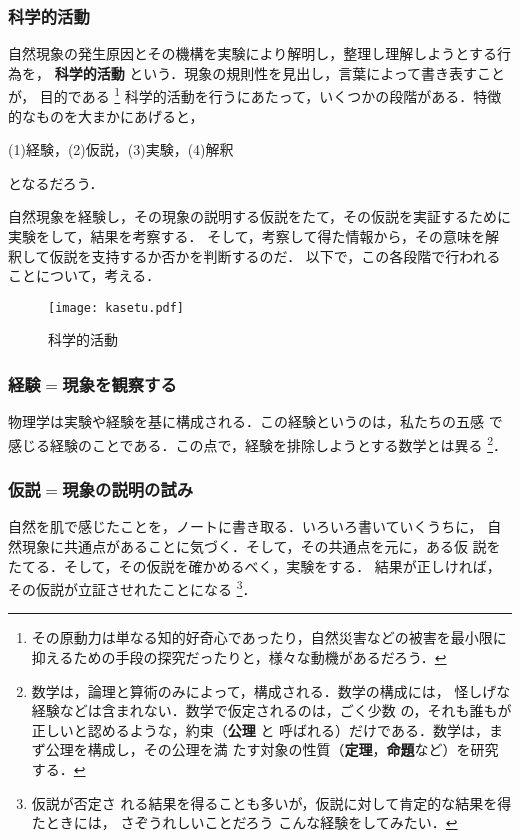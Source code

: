         \subsubsection{科学的活動}
            自然現象の発生原因とその機構を実験により解明し，整理し理解しようとする行為を，
            \textbf{科学的活動} という．現象の規則性を見出し，言葉によって書き表すことが，
            目的である
                \footnote{
                    その原動力は単なる知的好奇心であったり，自然災害などの被害を最小限に
                    抑えるための手段の探究だったりと，様々な動機があるだろう．
                }
            科学的活動を行うにあたって，いくつかの段階がある．特徴的なものを大まかにあげると，
            \begin{center}
                (1)経験，(2)仮説，(3)実験，(4)解釈
            \end{center}
            となるだろう．

            自然現象を経験し，その現象の説明する仮説をたて，その仮説を実証するために実験をして，結果を考察する．
            そして，考察して得た情報から，その意味を解釈して仮説を支持するか否かを判断するのだ．
            以下で，この各段階で行われることについて，考える．
            \begin{figure}[hbt]
                \begin{center}
                    \texttt{[image: kasetu.pdf]}
                    \caption{科学的活動}
                    \label{fig:kasetu1}
                \end{center}
            \end{figure}

        \subsubsection{経験$=$現象を観察する}
            物理学は実験や経験を基に構成される．この経験というのは，私たちの五感
            で感じる経験のことである．この点で，経験を排除しようとする数学とは異る
                \footnote{
                    数学は，論理と算術のみによって，構成される．数学の構成には，
                    怪しげな経験などは含まれない．数学で仮定されるのは，ごく少数
                    の，それも誰もが正しいと認めるような，約束（\textbf{公理} と
                    呼ばれる）だけである．数学は，まず公理を構成し，その公理を満
                    たす対象の性質（\textbf{定理}，\textbf{命題}など）を研究する．
                }．

        \subsubsection{仮説$=$現象の説明の試み}
            自然を肌で感じたことを，ノートに書き取る．いろいろ書いていくうちに，
            自然現象に共通点があることに気づく．そして，その共通点を元に，ある仮
            説をたてる．そして，その仮説を確かめるべく，実験をする．
            結果が正しければ，その仮説が立証させれたことになる
                \footnote{
                    仮説が否定さ
                    れる結果を得ることも多いが，仮説に対して肯定的な結果を得たときには，
                    さぞうれしいことだろう
                    こんな経験をしてみたい．
                }．


